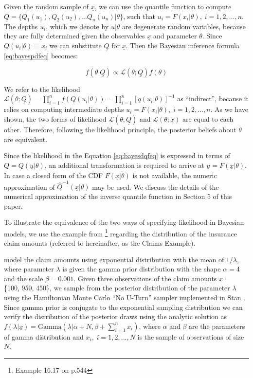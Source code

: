 \documentclass[
  12pt,
]{article}
\begin{document}
Given the random sample of \(\underline x\), we can use the quantile function to compute \(\underline{Q}=\{Q_1(u_1), Q_2(u_2), \dots Q_n(u_n)|\theta\}\), such that \(u_i=F(x_i|\theta), \; i=1,2,\dots, n\). The depths \(u_i\), which we denote by \(\underline u|\theta\) are degenerate random variables, because they are fully determined given the observables \(\underline{x}\) and parameter \(\theta\). Since \(Q(u_i|\theta)=x_i\) we can substitute \(\underline Q\) for \(\underline x\). Then the Bayesian inference formula \eqref{eq:bayespdfeq} becomes:

\[
f(\theta|\underline{Q}) \propto \mathcal{L}(\theta;\underline{Q})f(\theta)
\label{eq:bayesdqfeq}
\]

We refer to the likelihood \(\mathcal{L}(\theta;\underline{Q})=\prod_{i=1}^{n} f(Q(u_i|\theta))=\prod_{i=1}^n[q(u_i|\theta)]^{-1}\) as ``indirect'', because it relies on computing intermediate depths \(u_i=F(x_i|\theta), \; i=1,2,\dots, n\). As we have shown, the two forms of likelihood \(\mathcal{L}(\theta;\underline{Q})\) and \(\mathcal{L}(\theta;\underline{x})\) are equal to each other. Therefore, following the likelihood principle, the posterior beliefs about \(\theta\) are equivalent.

Since the likelihood in the Equation \eqref{eq:bayesdqfeq} is expressed in terms of \(\underline {Q}=Q(\underline{u}|\theta)\), an additional transformation is required to arrive at \(\underline{u}=F(\underline{x}|\theta)\). In case a closed form of the CDF \(F(\underline x|\theta)\) is not available, the numeric approximation of \(\widehat{Q}^{-1}(\underline{x}|\theta)\) may be used. We discuss the details of the numerical approximation of the inverse quantile function in Section 5 of this paper.

To illustrate the equivalence of the two ways of specifying likelihood in Bayesian models, we use the example from \citet{klugman2004LossModelsData}\footnote{Example 16.17 on p.544} regarding the distribution of the insurance claim amounts (referred to hereinafter, as the Claims Example).

\citet{klugman2004LossModelsData} model the claim amounts using exponential distribution with the mean of \(1/\lambda\), where parameter \(\lambda\) is given the gamma prior distribution with the shape \(\alpha=4\) and the scale \(\beta=0.001\). Given three observations of the claim amounts \(\underline x=\) \{100, 950, 450\}, we sample from the posterior distribution of the parameter \(\lambda\) using the Hamiltonian Monte Carlo ``No U-Turn'' sampler implemented in Stan \citep{standevelopmentteam2021RStanInterfaceStan}. Since gamma prior is conjugate to the exponential sampling distribution \citep{pratt1995IntroductionStatisticalDecision} we can verify the distribution of the posterior draws using the analytic solution as \(f(\lambda|\underline{x})=\text{Gamma}(\lambda| \alpha+N, \beta+\sum_{i=1}^n {x_i})\), where \(\alpha\) and \(\beta\) are the parameters of gamma distribution and \(x_i, \; i=1,2,\dots, N\) is the sample of observations of size \(N\).
\end{document}

